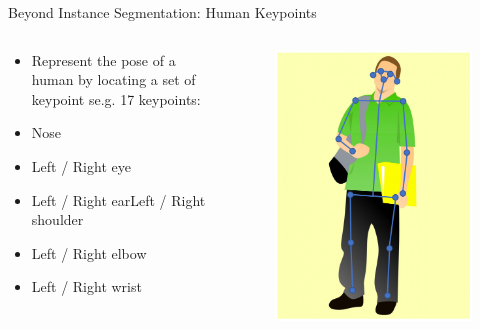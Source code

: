 \documentclass[10pt]{beamer}
\theoremstyle{remark}
\theoremstyle{definition}
\begin{document}
\begin{frame}{Beyond Instance Segmentation: Human Keypoints}
    \begin{columns}
    \begin{column}{0.6\textwidth}
        \begin{itemize}
            \item Represent the pose of a human by locating a set of keypoint
            se.g. 17 keypoints:
            \item Nose
            \item Left / Right eye
            \item Left / Right earLeft / Right shoulder
            \item Left / Right elbow
            \item Left / Right wrist
        \end{itemize}
    \end{column}
    \begin{column}{0.4\textwidth}
        \begin{figure}
        \centering
        \includegraphics[width=1.0\textwidth,height=1.0\textheight,keepaspectratio]{./images/ins_12.png}
        \end{figure}
    \end{column}
    \end{columns}
\end{frame}
\end{document}
